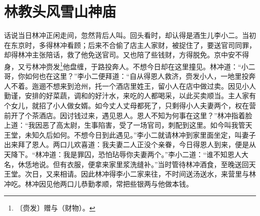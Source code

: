 \documentclass[12pt,UTF-8,openany]{ctexbook}
\begin{document}
\chapter{林教头风雪山神庙}

\begin{normalsize}
    
    话说当日林冲正闲走间，忽然背后人叫。回头看时，却认得是酒生儿李小二。当初在东京时，多得林冲看顾；后来不合偷了店主人家财，被捉住了，要送官司同罪，却得林冲主张陪话，救了他免送官司。又也陪了些钱财，方得脱免。京中安不得身，又亏林冲赍发\footnote{〔赍发〕赠与（财物）。}他盘缠，于路投奔人。不想今日却在这里撞见。林冲道：“小二哥，你如何也在这里？”李小二便拜道：“自从得恩人救济，赍发小人，一地里投奔人不着。迤逦不想来到沧州，托一个酒店里姓王，留小人在店中做过卖。因见小人勤谨，安排的好菜蔬，调和的好汁水，来吃的人都喝采，以此买卖顺当。主人家有个女儿，就招了小人做女婿。如今丈人丈母都死了，只剩得小人夫妻两个，权在营前开了个茶酒店。因讨钱过来，遇见恩人。恩人不知为何事在这里？”林冲指着脸上道：“我因恶了高太尉，生事陷害，受了一场官司，刺配到这里。如今叫我管天王堂，未知久后如何。不想今日到此遇见。”李小二就请林冲到家里面坐定，叫妻子出来拜了恩人。两口儿欢喜道：我夫妻二人正没个亲眷，今日得恩人到来，便是从天降下。“林冲道：我是罪囚，恐怕玷辱你夫妻两个。”李小二道：“谁不知恩人大名，休恁地说。但有衣服，便拿来家里浆洗缝补。”当时管待林冲酒食，至晚送回天王堂。次日，又来相请。因此林冲得李小二家来往，不时间送汤送水，来营里与林冲吃。林冲因见他两口儿恭勤孝顺，常把些银两与他做本钱。
    

\end{normalsize}
\end{document}
